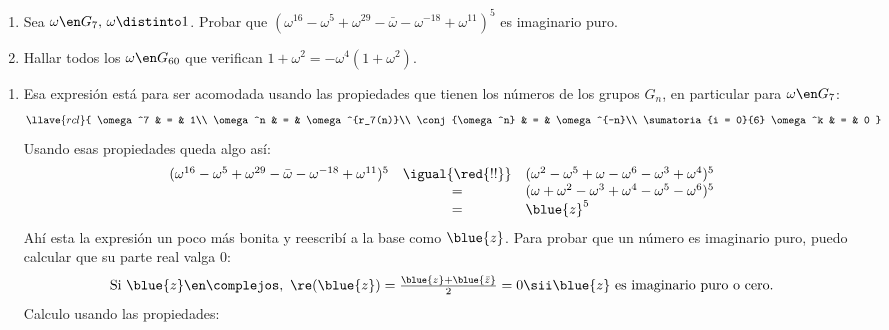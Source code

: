 \begin{enunciado}{\ejExtra}
  \begin{enumerate}[label=(\alph*)]
    \item Sea $\omega \en G_7,\, \omega \distinto 1$. Probar que
          $(\omega^{16} - \omega^5 + \omega^{29} - \bar{\omega} - \omega^{-18} + \omega^{11})^5$ es imaginario puro.
    \item Hallar todos los $\omega \en G_{60}$ que verifican $1 + \omega^2 = - \omega^4(1 + \omega^2)$.
  \end{enumerate}
\end{enunciado}

\begin{enumerate}[label=(\alph*)]
  \item Esa expresión está para ser acomodada usando las propiedades que tienen los números de los grupos $G_n$,
        en particular para $\omega \en G_7$:
        $$
          \llave{rcl}{
            \omega^7 & = & 1\\
            \omega^n & = & \omega^{r_7(n)}\\
            \conj{\omega^n} & = & \omega^{-n}\\
            \sumatoria{i = 0}{6} \omega^k & = & 0
          }
        $$
        Usando esas propiedades queda algo así:
        $$
          \begin{array}{rcl}
            (\omega^{16} - \omega^5 + \omega^{29} - \bar{\omega} - \omega^{-18} + \omega^{11})^5
             & \igual{\red{!!}} &
            (\omega^2 - \omega^5 + \omega - \omega^6 - \omega^3 + \omega^4)^5 \\
             & =                &
            (\omega + \omega^2 - \omega^3 + \omega^4 - \omega^5 - \omega^6)^5 \\
             & =                &
            \blue{z}^5                                                        \\
          \end{array}
        $$
        Ahí esta la expresión un poco más bonita y reescribí a la base como $\blue{z}$. Para probar que un número es imaginario puro,
        puedo calcular que su parte real valga 0:
        $$
          \textstyle
          \text{Si } \blue{z} \en \complejos,~ \re(\blue{z}) = \frac{\blue{z} + \blue{\bar{z}}}{2} = 0
          \sii
          \blue{z} \text{ es imaginario puro o cero}.
        $$
        Calculo usando las propiedades:
        $$
          \begin{array}{rcl}

\end{array}$$
\end{enumerate}
